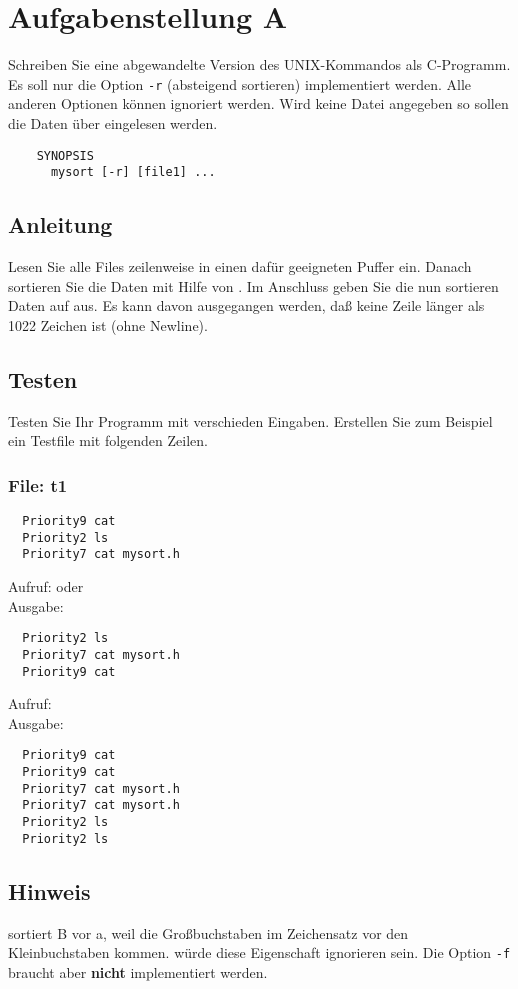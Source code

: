 




\section*{Aufgabenstellung A}
Schreiben Sie eine abgewandelte Version des UNIX-Kommandos  als C-Programm. Es soll nur die Option \verb|-r| (absteigend sortieren) implementiert werden. Alle anderen Optionen können ignoriert werden. Wird keine Datei angegeben so sollen die Daten \"uber  eingelesen werden.

\begin{verbatim}
	SYNOPSIS
	  mysort [-r] [file1] ...
\end{verbatim}

\subsection*{Anleitung}
Lesen Sie alle Files zeilenweise in einen dafür geeigneten Puffer ein.
Danach sortieren Sie die Daten mit Hilfe von . Im Anschluss geben Sie die nun sortieren Daten auf  aus. Es kann davon ausgegangen werden, daß keine Zeile länger als 1022 Zeichen ist (ohne Newline).

\subsection*{Testen}
Testen Sie Ihr Programm mit verschieden Eingaben. Erstellen Sie zum Beispiel ein Testfile  mit folgenden Zeilen.

\subsubsection*{File: t1}
\begin{verbatim}
  Priority9 cat
  Priority2 ls
  Priority7 cat mysort.h
\end{verbatim}
Aufruf:  oder  \\
Ausgabe: 
\begin{verbatim}
  Priority2 ls
  Priority7 cat mysort.h
  Priority9 cat
\end{verbatim}


Aufruf:  \\
Ausgabe: 
\begin{verbatim}
  Priority9 cat
  Priority9 cat
  Priority7 cat mysort.h
  Priority7 cat mysort.h
  Priority2 ls
  Priority2 ls
\end{verbatim}

\subsection*{Hinweis}
 sortiert B vor a, weil die Großbuchstaben im Zeichensatz vor den Kleinbuchstaben kommen.  würde diese Eigenschaft ignorieren sein. Die Option \verb|-f| braucht aber \textbf{nicht} implementiert werden.

\osueguidelinesone


